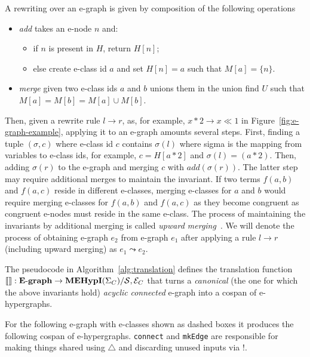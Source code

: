 \begin{definition}
A rewriting over an e-graph is given by composition of the following operations
\begin{itemize}
    \item \textit{add} takes an e-node $n$ and:
    \begin{itemize}
        \item if $n$ is present in $H$, return $H[n]$;
        \item else create e-class id $a$ and set $H[n] = a$ such that $M[a] = \{n\}$.
    \end{itemize}
    \item \textit{merge} given two e-class ids $a$ and $b$ unions them in the union find $U$ such that $M[a] = M[b] = M[a] \cup M[b]$.
\end{itemize}
\end{definition}
Then, given a rewrite rule $l \to r$, as, for example, $x * 2 \to x \ll 1$ in Figure~\ref{fig:e-graph-example}, applying it to an e-graph amounts several steps.
First, finding a tuple $(\sigma, c)$ where e-class id $c$ contains $\sigma(l)$ where sigma is the mapping from variables to e-class ids, for example, $c = H[a * 2]$ and $\sigma(l) = (a * 2)$.
Then, adding $\sigma(r)$ to the e-graph and merging $c$ with $add(\sigma(r))$.
The latter step may require additional merges to maintain the invariant.
If two terms $f(a,b)$ and $f(a,c)$ reside in different e-classes, merging e-classes for $a$ and $b$ would require merging e-classes for $f(a,b)$ and $f(a,c)$ as they become congruent as congruent e-nodes must reside in the same e-class.
The process of maintaining the invariants by additional merging is called \textit{upward merging}~\cite{EggPaper}.
We will denote the process of obtaining e-graph $e_2$ from e-graph $e_1$ after applying a rule $l \to r$ (including upward merging) as $e_1 \leadsto e_2$.


\begin{definition}
The pseudocode in Algorithm~\ref{alg:translation} defines the translation function $\llbracket \rrbracket : \mathbf{E}\text{-}\mathbf{graph} \to \mathbf{MEHypI}(\Sigma_{C}) / \mathcal{S}, \mathcal{E}_{C}$ that turns a \textit{canonical} (the one for which the above invariants hold) \textit{acyclic} \textit{connected} e-graph into a cospan of e-hypergraphs.
\end{definition}

For the following e-graph with e-classes shown as dashed boxes it produces the following cospan of e-hypergraphs.
\texttt{connect} and \texttt{mkEdge} are responsible for making things shared using $\triangle$ and discarding unused inputs via $!$.

